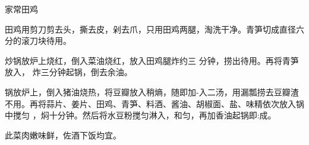 \begin{recipe}{家常田鸡}

\ingredients


\cooking

\step 田鸡用剪刀剪去头，撕去皮，剁去爪，只用田鸡两腿，淘洗干净。青笋切成直径六
分的滚刀块待用。

炒锅放炉上烧红，倒入菜油烧红，放入田鸡腿炸约三 分钟，捞出待用。再将青笋放入，
炸三分钟起锅，倒去余油。

\step 锅放炉上，倒入猪油烧热，将豆瓣放入稍熵，随即加-入二汤，用漏瓢捞去豆瓣渣
不用。再将蒜片、姜片、田鸡、青笋、料酒、酱油、胡椒面、盐、味精依次放入锅中搅匀
，焖十分钟。然后将水豆粉搅匀淋入，和匀，再加香油起锅即:成。

\features

此菜肉嫩味鲜，佐酒下饭均宜。

\end{recipe}

